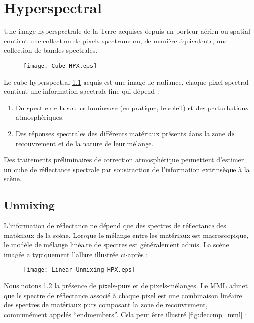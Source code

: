 \chapter{Hyperspectral}

Une image hyperspectrale de la Terre acquises depuis
un porteur aérien ou spatial contient une collection de pixels
spectraux ou, de manière équivalente, une collection de bandes
spectrales.

\begin{figure}[h]
  \centering
  \texttt{[image: Cube\_HPX.eps]}
  \label{fig:cube}
\end{figure}

Le cube hyperspectral \ref{fig:cube} acquis est une image de
radiance, chaque pixel spectral contient une information spectrale
fine qui dépend : 

\begin{enumerate}
\item{Du spectre de la source lumineuse (en pratique, le
soleil) et des perturbations atmosphériques.}
\item{Des réponses spectrales
des différents matériaux présents dans la zone de recouvrement et de la nature de leur mélange.}
\end{enumerate}

Des traitements préliminaires de
correction atmosphérique permettent d'estimer un cube de réflectance
spectrale par soustraction de l'information extrinsèque à la
scène. 

\section{Unmixing}

L'information de réflectance ne dépend que des spectres de
réflectance des matériaux de la scène. Lorsque le mélange entre les
matériaux est macroscopique, le modèle de mélange linéaire de spectres
est généralement admis. La scène imagée a typiquement l'allure
illustrée ci-après :

\begin{figure}[h]
  \centering
  \texttt{[image: Linear\_Unmixing\_HPX.eps]}
  \label{fig:linear_unmixing}
\end{figure}

Nous notons \ref{fig:linear_unmixing}  la
présence de pixels-purs et de pixels-mélanges. Le MML admet que le
spectre de réflectance associé à chaque pixel est une combinaison
linéaire des spectres de matériaux purs composant la zone de
recouvrement, communément appelés ``endmembers''. Cela peut être
illustré \ref{fig:decomp_mml} :

